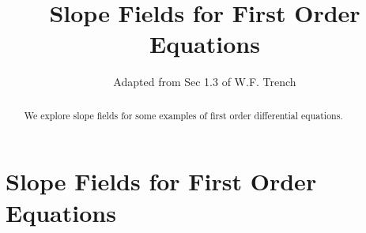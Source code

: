 \documentclass{ximera}
\title{Slope Fields for First Order Equations}
\author{Adapted from Sec 1.3 of W.F. Trench}
\begin{document}
 
\begin{abstract}
We explore slope fields for some examples of first order differential equations.
\end{abstract}
 
\maketitle
 
\section*{Slope Fields for First Order Equations}
 
 
   
 
\end{document}
